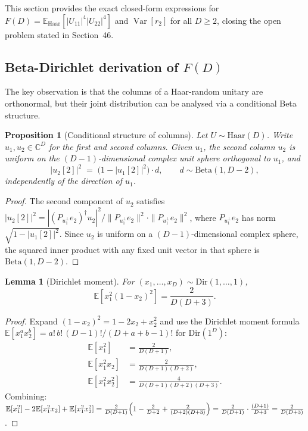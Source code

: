 \documentclass[12pt,a4paper]{article}
\newtheorem{lemma}[theorem]{Lemma}
\newtheorem{proposition}[theorem]{Proposition}
\begin{document}
This section provides the exact closed-form expressions for
$F(D)=\mathbb{E}_{\mathrm{Haar}}[|U_{11}|^4|U_{22}|^4]$ and
$\operatorname{Var}[r_2]$ for all $D\geq2$, closing the open problem
stated in Section~46.

\subsection{Beta-Dirichlet derivation of $F(D)$}
\label{sec:F_exact}

The key observation is that the columns of a Haar-random unitary
are orthonormal, but their joint distribution can be analysed
via a conditional Beta structure.

\begin{proposition}[Conditional structure of columns]
\label{prop:col_conditional}
Let $U\sim\mathrm{Haar}(D)$.  Write $u_1,u_2\in\mathbb{C}^D$ for the first and
second columns.  Given $u_1$, the second column $u_2$ is uniform on the
$(D-1)$-dimensional complex unit sphere orthogonal to $u_1$, and
\[
  |u_2[2]|^2 \;=\; \bigl(1-|u_1[2]|^2\bigr)\cdot d,
  \qquad d\sim\mathrm{Beta}(1,D-2),
\]
independently of the direction of $u_1$.
\end{proposition}

\begin{proof}
The second component of $u_2$ satisfies
$|u_2[2]|^2=|(P_{u_1^\perp}e_2)^\dagger u_2|^2/\|P_{u_1^\perp}e_2\|^2\cdot\|P_{u_1^\perp}e_2\|^2$,
where $P_{u_1^\perp}e_2$ has norm $\sqrt{1-|u_1[2]|^2}$.
Since $u_2$ is uniform on a $(D-1)$-dimensional complex sphere,
the squared inner product with any fixed unit vector in that sphere
is $\mathrm{Beta}(1,D-2)$.
\end{proof}

\begin{lemma}[Dirichlet moment]
\label{lem:dir_moment}
For $(x_1,\ldots,x_D)\sim\mathrm{Dir}(1,\ldots,1)$,
\[
  \mathbb{E}\!\left[x_1^2(1-x_2)^2\right] = \frac{2}{D(D+3)}.
\]
\end{lemma}

\begin{proof}
Expand $(1-x_2)^2=1-2x_2+x_2^2$ and use the Dirichlet moment formula
$\mathbb{E}[x_1^a x_2^b]=a!\,b!\,(D-1)!/(D+a+b-1)!$ for $\mathrm{Dir}(1^D)$:
\begin{align*}
  \mathbb{E}[x_1^2] &= \frac{2}{D(D+1)},\\
  \mathbb{E}[x_1^2 x_2] &= \frac{2}{D(D+1)(D+2)},\\
  \mathbb{E}[x_1^2 x_2^2] &= \frac{4}{D(D+1)(D+2)(D+3)}.
\end{align*}
Combining:
$\mathbb{E}[x_1^2]-2\mathbb{E}[x_1^2 x_2]+\mathbb{E}[x_1^2 x_2^2]
=\frac{2}{D(D+1)}\Bigl(1-\frac{2}{D+2}+\frac{2}{(D+2)(D+3)}\Bigr)
=\frac{2}{D(D+1)}\cdot\frac{(D+1)}{D+3}=\frac{2}{D(D+3)}$.
\end{proof}
\end{document}
